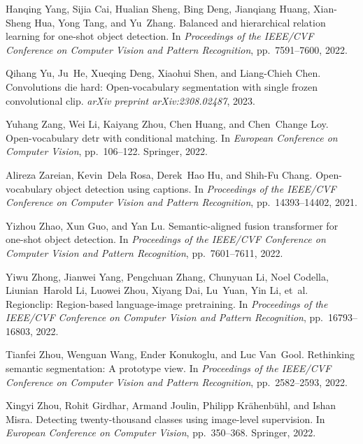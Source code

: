 \begin{thebibliography}{52}
Hanqing Yang, Sijia Cai, Hualian Sheng, Bing Deng, Jianqiang Huang, Xian-Sheng
  Hua, Yong Tang, and Yu~Zhang.
\newblock Balanced and hierarchical relation learning for one-shot object
  detection.
\newblock In \emph{Proceedings of the IEEE/CVF Conference on Computer Vision
  and Pattern Recognition}, pp.\  7591--7600, 2022.

Qihang Yu, Ju~He, Xueqing Deng, Xiaohui Shen, and Liang-Chieh Chen.
\newblock Convolutions die hard: Open-vocabulary segmentation with single
  frozen convolutional clip.
\newblock \emph{arXiv preprint arXiv:2308.02487}, 2023.

Yuhang Zang, Wei Li, Kaiyang Zhou, Chen Huang, and Chen~Change Loy.
\newblock Open-vocabulary detr with conditional matching.
\newblock In \emph{European Conference on Computer Vision}, pp.\  106--122.
  Springer, 2022.

Alireza Zareian, Kevin~Dela Rosa, Derek~Hao Hu, and Shih-Fu Chang.
\newblock Open-vocabulary object detection using captions.
\newblock In \emph{Proceedings of the IEEE/CVF Conference on Computer Vision
  and Pattern Recognition}, pp.\  14393--14402, 2021.

Yizhou Zhao, Xun Guo, and Yan Lu.
\newblock Semantic-aligned fusion transformer for one-shot object detection.
\newblock In \emph{Proceedings of the IEEE/CVF Conference on Computer Vision
  and Pattern Recognition}, pp.\  7601--7611, 2022.

Yiwu Zhong, Jianwei Yang, Pengchuan Zhang, Chunyuan Li, Noel Codella,
  Liunian~Harold Li, Luowei Zhou, Xiyang Dai, Lu~Yuan, Yin Li, et~al.
\newblock Regionclip: Region-based language-image pretraining.
\newblock In \emph{Proceedings of the IEEE/CVF Conference on Computer Vision
  and Pattern Recognition}, pp.\  16793--16803, 2022.

Tianfei Zhou, Wenguan Wang, Ender Konukoglu, and Luc Van~Gool.
\newblock Rethinking semantic segmentation: A prototype view.
\newblock In \emph{Proceedings of the IEEE/CVF Conference on Computer Vision
  and Pattern Recognition}, pp.\  2582--2593, 2022{}.

Xingyi Zhou, Rohit Girdhar, Armand Joulin, Philipp Kr{\"a}henb{\"u}hl, and
  Ishan Misra.
\newblock Detecting twenty-thousand classes using image-level supervision.
\newblock In \emph{European Conference on Computer Vision}, pp.\  350--368.
  Springer, 2022{}.

\end{thebibliography}
